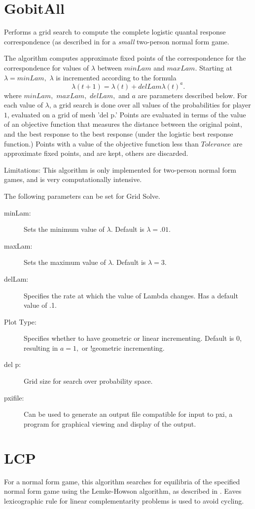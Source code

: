 \section{GobitAll}
Performs a grid search to compute the complete logistic
quantal response correspondence (as described in \cite{McKPal:95a}
for a {\em small} two-person normal form game.  

The algorithm computes approximate fixed points of the correspondence for 
the correspondence for values of $\lambda$ between $minLam$
and $maxLam.$  Starting at $\lambda = minLam,$ $\lambda$ is incremented
according to the formula $$ \lambda(t+1) = \lambda(t) +delLam \lambda(t)^a.
$$ 
where $minLam,$ $maxLam,$ $delLam,$ and $a$ are parameters described
below. For each value of $\lambda$, a grid search is done over all values
of the probabilities for player $1$, evaluated on a grid of mesh 'del p.'
Points are evaluated in terms of the value of an objective function that
measures the distance between the original point, and the best response to
the best response (under the logistic best response function.)  Points
with a value of the objective function less than $Tolerance$ are
approximate fixed points, and are kept, others are discarded.

Limitations:  This algorithm is only implemented for two-person normal
form games, and is very computationally intensive.
  
The following parameters can be set for Grid Solve.

\begin{description}
\item[minLam:] Sets the minimum value of $\lambda.$
Default is $\lambda = .01.$
\item[maxLam:]  Sets the maximum value of $\lambda.$
Default is $\lambda = 3.$ 
\item[delLam:] Specifies the rate at which the value of Lambda changes.
Has a default value of .1.
\item[Plot Type:] Specifies whether to have geometric or linear incrementing.
Default is 0, resulting in $a = 1,$ or !geometric incrementing.
\item[del p:] Grid size for search over probability space.  

\item[pxifile:] Can be used to generate an output file compatible for
input to pxi, a program for graphical viewing and display of the output.
\end{description}

\section{LCP}
For a normal form game, this algorithm searches for equilibria of the
specified normal form game using the Lemke-Howson algorithm, as described
in \cite{LemHow:64}. Eaves \cite{Eav:71} lexicographic rule for
linear complementarity problems is used to avoid cycling.

